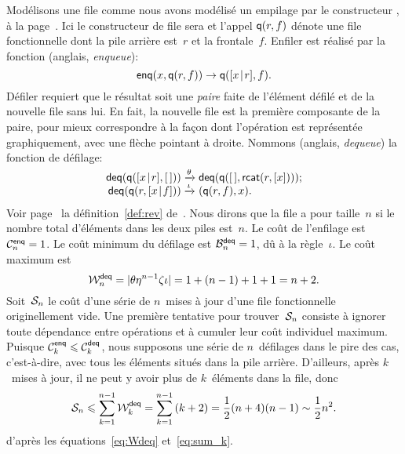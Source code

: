 Modélisons une file comme nous avons modélisé un empilage par le
constructeur , à la
page~\pageref{par:stacks}. Ici le constructeur de file sera
 et l'appel \(\fun{q}(r,f)\) dénote une
file fonctionnelle dont la pile arrière est~\(r\) et la
frontale~\(f\). Enfiler est réalisé par la fonction
 (anglais, \emph{enqueue}):
\begin{equation}
\fun{enq}(x,\fun{q}(r,f)) \rightarrow \fun{q}(\cons{x}{r},f).
\label{def:enq}
\end{equation}
Défiler requiert que le résultat soit une \emph{paire} faite de l'élément défilé et de la nouvelle file
sans lui. En fait, la nouvelle file est la première composante de la
paire, pour mieux correspondre à la façon dont l'opération est
représentée graphiquement, avec une flèche pointant à droite.
Nommons  (anglais, \emph{dequeue})
la fonction de défilage:
\begin{equation}
\begin{array}{@{}r@{\;}l@{\;}l@{}}
  \fun{deq}(\fun{q}(\cons{x}{r},\el))
& \xrightarrow{\smash{\theta}}
& \fun{deq}(\fun{q}(\el,\fun{rcat}(r,[x])));\\
  \fun{deq}(\fun{q}(r,\cons{x}{f}))
& \xrightarrow{\smash{\iota}}
& \pair{\fun{q}(r,f)}{x}.
\end{array}
\label{def:deq}
\end{equation}
Voir page~\pageref{def:rev} la définition~\eqref{def:rev}
de~. Nous dirons que la file a
pour taille~\(n\) si le nombre total d'éléments dans les deux piles
est~\(n\).  Le coût de l'enfilage est
\(\C{\fun{enq}}{n} = 1\). Le coût
minimum du défilage est
\(\B{\fun{deq}}{n} = 1\), dû à la règle~\(\iota\). Le coût maximum est
\begin{equation}
  \W{\fun{deq}}{n} = \len{\theta\eta^{n-1}\zeta\iota} = 1 + (n-1)
+ 1 + 1 = n + 2. \label{eq:Wdeq}
\end{equation}
Soit~\(\A{n}\) le coût d'une série de \(n\)~mises à jour d'une file
fonctionnelle originellement vide. Une première tentative pour
trouver~\(\A{n}\) consiste à ignorer toute dépendance entre opérations
et à cumuler leur coût individuel maximum. Puisque \(\C{\fun{enq}}{k}
\leqslant \C{\fun{deq}}{k}\), nous supposons une série de
\(n\)~défilages dans le pire des cas, c'est-à-dire, avec tous les
éléments situés dans la pile arrière. D'ailleurs, après \(k\)~mises à
jour, il ne peut y avoir plus de \(k\)~éléments dans la file, donc
\begin{equation}
  \A{n} \leqslant \sum_{k=1}^{n-1}{\W{\fun{deq}}{k}} =
  \sum_{k=1}^{n-1}{(k+2)} =
  \frac{1}{2}(n+4)(n-1) \sim \frac{1}{2}{n^2}.
  \label{ineq:Sn_upper_bound}
\end{equation}
d'après les équations~\eqref{eq:Wdeq} et~\eqref{eq:sum_k}.


